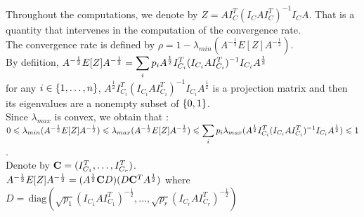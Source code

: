  
 
Throughout the computations, we denote by $Z = A I_{C}^{T} (I_{C} A I_{C}^{T})^{-1} I_{C} A$. That is a quantity that intervenes in the computation of the convergence rate.\\

The convergence rate is defined by $\rho = 1 - \lambda_{min}(A^{-\frac12}E[Z]A^{-\frac12}  )$.\\

By defiition, $A^{-\frac12}E[Z]A^{-\frac12} = \displaystyle\sum\limits_{i} p_{i} A^{\frac 12} I_{C_{i}}^{T} (I_{C_{i}}  A  I_{C_{i}}^{T})^{-1} I_{C_{i}} A^{\frac 12}$ \\

for any $i \in \left\{1,\dots,n\right\}$, $A^{\frac 12} I_{C_{i}}^{T} (I_{C_{i}}  A  I_{C_{i}}^{T})^{-1} I_{C_{i}} A^{\frac 12}$ is a projection matrix and then its eigenvalues are a nonempty subset of $\left\{0,1\right\}$.\\

Since $\lambda_{max}$ is convex, we obtain that :\\

$0 \leqslant \lambda_{min}(A^{-\frac12}E[Z]A^{-\frac12}) \leqslant  \lambda_{max}(A^{-\frac12}E[Z]A^{-\frac12}) \leqslant \displaystyle\sum\limits_{i} p_{i} \lambda_{max}(A^{\frac 12} I_{C_{i}}^{T} (I_{C_{i}}  A  I_{C_{i}}^{T})^{-1} I_{C_{i}} A^{\frac 12}) \leqslant 1$.\\

Denote by $\bold{C} = (I_{C_{1}}^{T},\dots,I_{C_{r}}^{T})$.\\

$A^{-\frac12}E[Z]A^{-\frac12} = (A^{\frac 12} \bold{C} D)(D \bold{C}^{T} A^{\frac 12})$ where $D =  \,\text{diag}(\sqrt{p_{1}} (I_{C_{1}}A I_{C_{1}}^{T})^{-\frac 12},\dots, \sqrt{p_{r}}(I_{C_{r}} A I_{C_{r}}^{T})^{-\frac 12})$
 
 
\pr 

